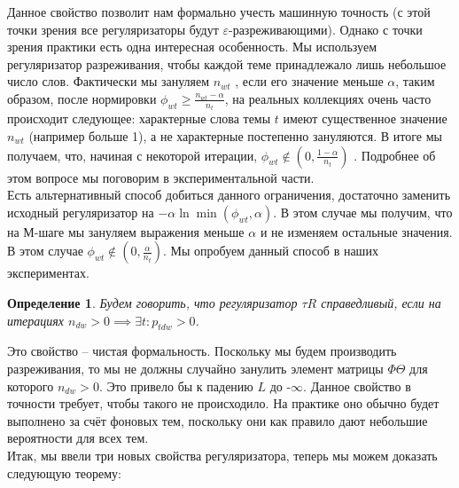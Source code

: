 \documentclass[12pt]{article}
\newtheorem{definition}{Определение}[section]
\renewcommand{\geq}{\geqslant}
\begin{document}
Данное свойство позволит нам формально учесть машинную точность (с этой точки зрения все регуляризаторы будут $\varepsilon$-разреживающими). Однако с точки зрения практики есть одна интересная особенность. Мы используем регуляризатор разреживания, чтобы каждой теме принадлежало лишь небольшое число слов. Фактически мы зануляем $n_{wt}$ , если его значение меньше $\alpha$, таким образом, после нормировки $\phi_{wt} \geq \frac{n_{wt} - \alpha}{n_t}$,  на реальных коллекциях очень часто происходит следующее: характерные слова темы $t$ имеют существенное значение $n_{wt}$ (например больше 1), а не характерные постепенно зануляются. В итоге мы получаем, что, начиная с некоторой итерации, $\phi_{wt} \notin (0, \frac{1-\alpha}{n_t})$ . Подробнее об этом вопросе мы поговорим в экспериментальной части.\\
Есть альтернативный способ добиться данного ограничения, достаточно заменить исходный регуляризатор на $-\alpha \ln \min(\phi_{wt}, \alpha)$. В этом случае мы получим, что на М-шаге мы зануляем выражения меньше $\alpha$ и не изменяем остальные значения. В этом случае $\phi_{wt}\notin (0, \frac{\alpha}{n_t})$. Мы опробуем данный способ в наших экспериментах.
\begin{definition}
Будем говорить, что регуляризатор $\tau R$ справедливый, если на итерациях $n_{dw} > 0 \implies \exists t\colon p_{tdw} > 0$.
\end{definition}
Это свойство -- чистая формальность. Поскольку мы будем производить разреживания, то мы не должны случайно занулить элемент матрицы $\Phi \Theta$ для которого $n_{dw} > 0$. Это привело бы к падению $L$ до -$\infty$.  Данное свойство в точности требует, чтобы такого не происходило. На практике оно обычно будет выполнено за счёт фоновых тем\cite{artmdef2}, поскольку они как правило дают небольшие вероятности для всех тем.\\
Итак, мы ввели три новых свойства регуляризатора, теперь мы можем доказать следующую теорему:
\end{document}
